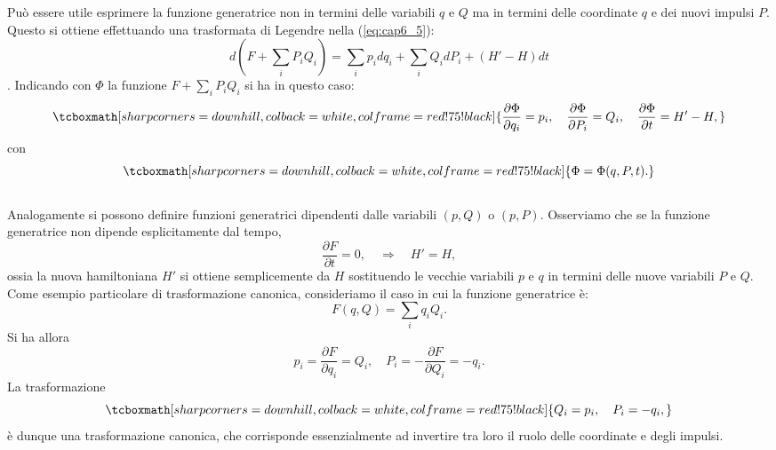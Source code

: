 Pu\`o essere utile esprimere la funzione generatrice non in termini delle variabili $q$ e $Q$ ma in termini delle coordinate $q$ e dei nuovi impulsi $P$. Questo si ottiene effettuando una trasformata di Legendre nella (\ref{eq:cap6_5}):
	\begin{equation}
		d(F+\sum_i P_iQ_i) = \sum_i p_i dq_i + \sum_i Q_i dP_i + (H'-H)dt
	\end{equation}.
Indicando con $\Phi$ la funzione $F+\sum_iP_i Q_i $ si ha in questo caso:
	\begin{equation}
		\tcboxmath[sharp corners=downhill ,colback=white,colframe=red!75!black]{
			\frac{\partial \Phi}{\partial q_i} = p_i , \quad \frac{\partial \Phi}{\partial P_i} = Q_i , \quad \frac{\partial \Phi}{\partial t} = H'- H ,
			}
		\label{eq:cap6_6}
	\end{equation}
con
	\begin{equation}
		\tcboxmath[sharp corners=downhill ,colback=white,colframe=red!75!black]{
			\Phi = \Phi (q,P,t) .
			}
	\end{equation}\\
	
Analogamente si possono definire funzioni generatrici dipendenti dalle variabili $(p,Q)$ o $(p,P)$. Osserviamo che se la funzione generatrice non dipende esplicitamente dal tempo,
	\begin{equation}
		\frac{\partial F}{\partial t} = 0 , \quad \Rightarrow \quad H' = H ,
	\end{equation}
ossia la nuova hamiltoniana $H'$ si ottiene semplicemente da $H$ sostituendo le vecchie variabili $p$ e $q$ in termini delle nuove variabili $P$ e $Q$.\\

Come esempio particolare di trasformazione canonica, consideriamo il caso in cui la funzione generatrice \`e:
	\begin{equation}
		F(q,Q) = \sum_i q_i Q_i .
	\end{equation}
Si ha allora
	\begin{equation}
		p_i = \frac{\partial F}{\partial q_i} = Q_i , \quad P_i = - \frac{\partial F}{\partial Q_i} = -q_i .
	\end{equation}
La trasformazione
	\begin{equation}
		\tcboxmath[sharp corners=downhill ,colback=white,colframe=red!75!black]{
			Q_i = p_i  , \quad P_i = -q_i ,
			}
	\end{equation}
\`e dunque una trasformazione canonica, che corrisponde essenzialmente ad invertire tra loro il ruolo delle coordinate e degli impulsi.

